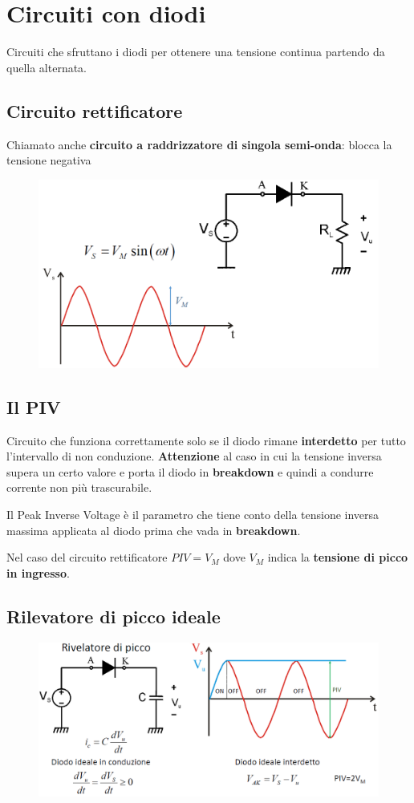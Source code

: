 \documentclass[11pt,a4paper,]{article}
\begin{document}
\section{Circuiti con diodi}
Circuiti che sfruttano i diodi per ottenere una tensione continua partendo da quella alternata.
\subsection{Circuito rettificatore}
Chiamato anche \textbf{circuito a raddrizzatore di singola semi-onda}: blocca la tensione negativa
\begin{figure}[H]
    \centering
    \includegraphics[width=0.5\linewidth]{img/circ rettificatore.png}
\end{figure}

\subsection{Il PIV}
Circuito che funziona correttamente solo se il diodo rimane \textbf{interdetto} per tutto l'intervallo di non conduzione.
\textbf{Attenzione} al caso in cui la tensione inversa supera un certo valore e porta il diodo in \textbf{breakdown} e quindi a condurre corrente non più trascurabile.
\begin{definizione}
    [PIV]
    Il Peak Inverse Voltage è il parametro che tiene conto della tensione inversa massima applicata al diodo prima che vada in \textbf{breakdown}.
    \begin{nota}
        Nel caso del circuito rettificatore $PIV = V_M$ dove \textbf{$V_M$} indica la \textbf{tensione di picco in ingresso}.
    \end{nota}
\end{definizione}
\subsection{Rilevatore di picco ideale}
\begin{figure}[H]
    \centering
    \includegraphics[width=0.5\linewidth]{img/Rilevatore di picco ideale.png}
\end{figure}
\end{document}
